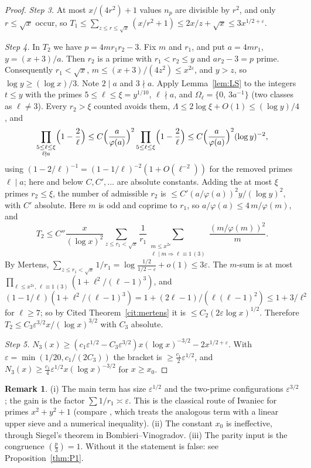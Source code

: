 \documentclass[11pt,reqno]{amsart}
\theoremstyle{definition}
\newtheorem{remark}[theorem]{Remark}
\newcommand{\leg}[2]{\left(\frac{#1}{#2}\right)}
\begin{document}
\begin{proof}
\emph{Step 3.}  At most $x/(4r^2)+1$ values $n_p$ are divisible by $r^2$, and
only $r\le\sqrt x$ occur, so $T_1\le\sum_{z\le r\le\sqrt x}(x/r^2+1)\le2x/z+\sqrt x\le3x^{1/2+\varepsilon}$.

\emph{Step 4.}  In $T_2$ we have $p=4mr_1r_2-3$.  Fix $m$ and $r_1$, and
put $a=4mr_1$, $y=(x+3)/a$.  Then $r_2$ is a prime with $r_1<r_2\le y$ and
$ar_2-3=p$ prime.  Consequently $r_1<\sqrt x$, $m\le(x+3)/(4z^2)\le
x^{2\varepsilon}$, and $y>z$, so $\log y\ge(\log x)/3$.  Note $2\mid a$ and
$3\nmid a$.  Apply Lemma~\ref{lem:LS} to the integers $t\le y$ with the
primes $5\le\ell\le\xi=y^{1/10}$, $\ell\nmid a$, and
$\Omega_\ell=\{0,\,3a^{-1}\}$ (two classes as $\ell\ne3$).  Every $r_2>\xi$
counted avoids them, $\Lambda\le2\log\xi+O(1)\le(\log y)/4$, and
\[
 \prod_{\substack{5\le\ell\le\xi\\ \ell\nmid a}}\Bigl(1-\frac2\ell\Bigr)
 \le C\Bigl(\frac a{\varphi(a)}\Bigr)^2\prod_{5\le\ell\le\xi}\Bigl(1-\frac2\ell\Bigr)
 \le C\Bigl(\frac a{\varphi(a)}\Bigr)^2(\log y)^{-2},
\]
using $(1-2/\ell)^{-1}=(1-1/\ell)^{-2}(1+O(\ell^{-2}))$ for the removed primes
$\ell\mid a$; here and below $C,C',\dots$ are absolute constants.
Adding the at most $\xi$ primes $r_2\le\xi$, the number of admissible $r_2$
is $\le C'(a/\varphi(a))^2y/(\log y)^2$, with $C'$ absolute.  Here $m$ is odd
and coprime to $r_1$, so $a/\varphi(a)\le4\,m/\varphi(m)$, and
\[
 T_2\le C''\frac{x}{(\log x)^2}
 \sum_{z\le r_1<\sqrt x}\frac1{r_1}
 \sum_{\substack{m\le x^{2\varepsilon}\\ \ell\mid m\Rightarrow\ell\equiv1\,(3)}}\frac{(m/\varphi(m))^2}m .
\]
By Mertens, $\sum_{z\le r_1<\sqrt x}1/r_1=\log\frac{1/2}{1/2-\varepsilon}+o(1)\le3\varepsilon$.
The $m$-sum is at most
$\prod_{\ell\le x^{2\varepsilon},\,\ell\equiv1\,(3)}(1+\ell^2/(\ell-1)^3)$, and
$(1-1/\ell)(1+\ell^2/(\ell-1)^3)=1+(2\ell-1)/(\ell(\ell-1)^2)\le1+3/\ell^2$ for
$\ell\ge7$; so by Cited Theorem~\ref{cit:mertens} it is
$\le C_2(2\varepsilon\log x)^{1/2}$.  Therefore
$T_2\le C_3\varepsilon^{3/2}x/(\log x)^{3/2}$ with $C_3$ absolute.

\emph{Step 5.}  $N_3(x)\ge(c_1\varepsilon^{1/2}-C_3\varepsilon^{3/2})x(\log x)^{-3/2}-2x^{1/2+\varepsilon}$.
With $\varepsilon=\min(1/20,c_1/(2C_3))$ the bracket is
$\ge\frac{c_1}2\varepsilon^{1/2}$, and $N_3(x)\ge\frac{c_1}4\varepsilon^{1/2}x(\log x)^{-3/2}$
for $x\ge x_0$.
\end{proof}

\begin{remark}\label{rem:W1}
(i) The main term has size $\varepsilon^{1/2}$ and the two-prime
configurations $\varepsilon^{3/2}$; the gain is the factor
$\sum1/r_1\asymp\varepsilon$.  This is the classical route of Iwaniec for
primes $x^2+y^2+1$ (compare \cite[\S6]{Ter}, which treats the analogous
term with a linear upper sieve and a numerical inequality).
(ii) The constant $x_0$ is ineffective, through Siegel's theorem in
Bombieri--Vinogradov.
(iii) The parity input is the congruence $\leg p3=1$.  Without it the
statement is false: see Proposition~\ref{thm:P1}.
\end{remark}
\end{document}
